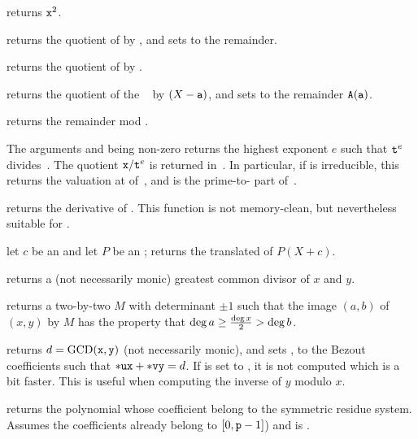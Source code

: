  returns ${\tt x}^2$.

 returns the quotient
of  by , and sets  to the remainder.

 returns the quotient of  by
.

 returns the
quotient of the ~ by $(X - {\tt a})$, and sets  to the
remainder ${\tt A}({\tt a})$.

 returns the remainder  mod
.

 The arguments  and
 being non-zero  returns the highest exponent $e$ such that
${\tt t}^{e}$ divides~. The quotient ${\tt x}/{\tt t}^{e}$ is returned
in~. In particular, if  is irreducible, this returns the
valuation at  of~, and  is the prime-to- part
of~.

 returns the derivative of .
This function is not memory-clean, but nevertheless suitable for
.

 let $c$ be an  and let
$P$ be an ; returns the translated  of $P(X+c)$.

 returns a (not necessarily monic)
greatest common divisor of $x$  and $y$.

 returns a two-by-two 
$M$ with determinant $\pm 1$ such that the image $(a,b)$ of $(x,y)$ by $M$
has the property that $\deg a \geq {\deg x \over 2} > \deg b$.

 returns
$d = {\rm GCD}({\tt x},{\tt y})$ (not necessarily monic), and sets ,
 to the Bezout coefficients such that ${\tt *ux} + {\tt *vy} = d$.
If  is set to , it is not computed which is a bit faster.
This is useful when computing the inverse of $y$ modulo $x$.

 returns the polynomial whose
coefficient belong to the symmetric residue system. Assumes the coefficients
already belong to $[0,{\tt p}-1]$) and  is .


